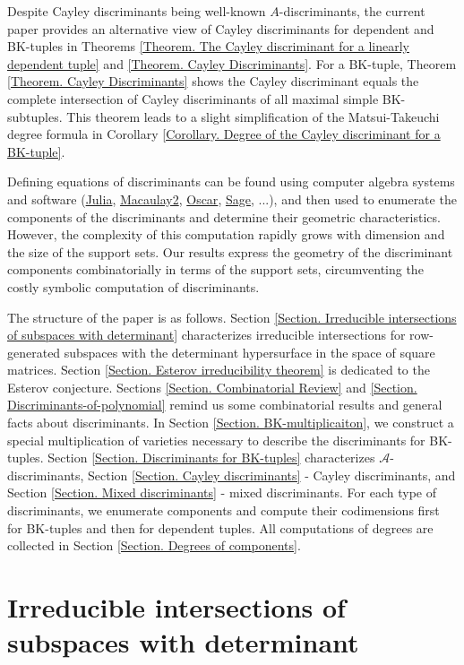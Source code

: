 \documentclass[11pt]{article}
\theoremstyle{plain}
\theoremstyle{definition}
\theoremstyle{remark}
\theoremstyle{plain}
\theoremstyle{plain}
\theoremstyle{plain}
\theoremstyle{definition}
\begin{document}
Despite Cayley discriminants being well-known $A$-discriminants,
the current paper provides an alternative view of Cayley discriminants
for  dependent and BK-tuples in Theorems \ref{Theorem. The Cayley discriminant for a linearly dependent tuple}
and \ref{Theorem. Cayley Discriminants}. For a BK-tuple, Theorem
\ref{Theorem. Cayley Discriminants} shows the Cayley discriminant
equals the complete intersection of Cayley discriminants of all maximal
simple BK-subtuples. This theorem leads to a slight simplification
of the Matsui-Takeuchi degree formula in Corollary \ref{Corollary. Degree of the Cayley discriminant for a BK-tuple}.

Defining equations of discriminants can be found using computer algebra
systems and software (\href{https://symbolics.juliasymbolics.org/dev}{Julia},
\href{https://macaulay2.com}{Macaulay2}, \href{https://www.oscar-system.org}{Oscar},
\href{https://www.sagemath.org}{Sage}, ...), and then used to enumerate
the components of the discriminants and determine their geometric
characteristics. However, the complexity of this computation rapidly
grows with dimension and the size of the support sets. Our results
express the geometry of the discriminant components combinatorially
in terms of the support sets, circumventing the costly symbolic computation
of discriminants. 

The structure of the paper is as follows. Section \ref{Section. Irreducible intersections of subspaces with determinant}
characterizes irreducible intersections for row-generated subspaces
with the determinant hypersurface in the space of square matrices.
Section \ref{Section. Esterov irreducibility theorem} is dedicated
to the Esterov conjecture. Sections \ref{Section. Combinatorial Review}
and \ref{Section. Discriminants-of-polynomial} remind us some combinatorial
results and general facts about discriminants. In Section \ref{Section. BK-multiplicaiton},
we construct a special multiplication of varieties necessary to describe
the discriminants for BK-tuples. Section \ref{Section. Discriminants for BK-tuples}
characterizes $\mathscr{A}$-discriminants, Section \ref{Section. Cayley discriminants}
- Cayley discriminants, and Section \ref{Section. Mixed discriminants}
- mixed discriminants. For each type of discriminants, we enumerate
components and compute their codimensions first for BK-tuples and
then for dependent tuples. All computations of degrees are collected
in Section \ref{Section. Degrees of components}.

\section{\label{Section. Irreducible intersections of subspaces with determinant}Irreducible
intersections of subspaces with determinant}
\end{document}
